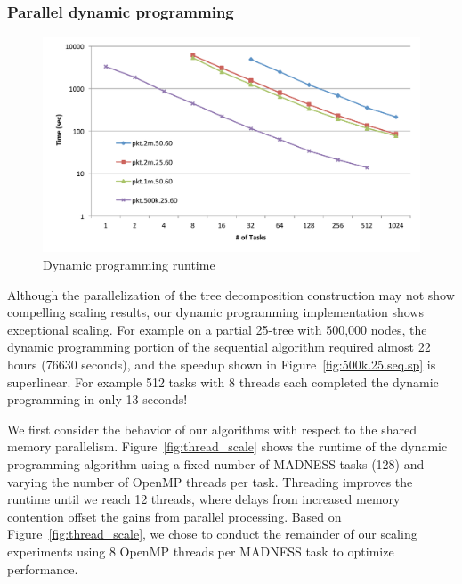 \documentclass[conference]{IEEEtran}
\begin{document}
\subsubsection{Parallel dynamic programming}\label{sec:exp_dp}

\begin{figure}[!t]
\includegraphics[angle=0,width=6in]{figures/newfig9_col.pdf}
\caption{Dynamic programming runtime}
\label{fig:DPtimes}
\end{figure}

Although the parallelization of the tree decomposition
construction may not show compelling scaling results, our dynamic
programming implementation shows exceptional scaling.
For example on a partial 25-tree with 500,000 nodes, the dynamic programming portion of the
sequential algorithm required almost 22 hours (76630 seconds), and the
speedup shown in Figure~\ref{fig:500k.25.seq.sp} is superlinear. For example 512 tasks with
8 threads each completed the dynamic programming in only 13 seconds!

We first consider the behavior of our algorithms with respect to the shared memory parallelism.
Figure~\ref{fig:thread_scale} shows the runtime of the dynamic programming algorithm using
a fixed number of MADNESS tasks (128) and varying the number of OpenMP threads per task.
Threading improves the runtime until we reach 12 threads, where delays from increased memory contention
offset the gains from parallel processing.  Based on Figure~\ref{fig:thread_scale}, we chose to conduct
the remainder of our scaling experiments using 8 OpenMP threads per MADNESS task to optimize performance.
\end{document}
